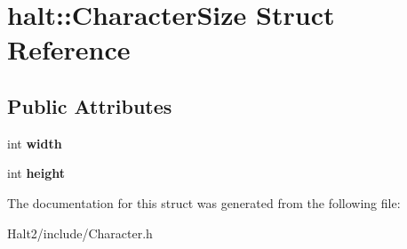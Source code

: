 \hypertarget{structhalt_1_1_character_size}{\section{halt\-:\-:\-Character\-Size \-Struct \-Reference}
\label{structhalt_1_1_character_size}
}
\subsection*{\-Public \-Attributes}
\begin{DoxyCompactItemize}
\item 
\hypertarget{structhalt_1_1_character_size_a461a83699bbb68646ce9cf8f01d4e0b2}{int {\bfseries width}}\label{structhalt_1_1_character_size_a461a83699bbb68646ce9cf8f01d4e0b2}

\item 
\hypertarget{structhalt_1_1_character_size_a49cfa8eb1bb9dec854a07db72f62ae30}{int {\bfseries height}}\label{structhalt_1_1_character_size_a49cfa8eb1bb9dec854a07db72f62ae30}

\end{DoxyCompactItemize}


\-The documentation for this struct was generated from the following file\-:\begin{DoxyCompactItemize}
\item 
\-Halt2/include/\-Character.\-h\end{DoxyCompactItemize}
